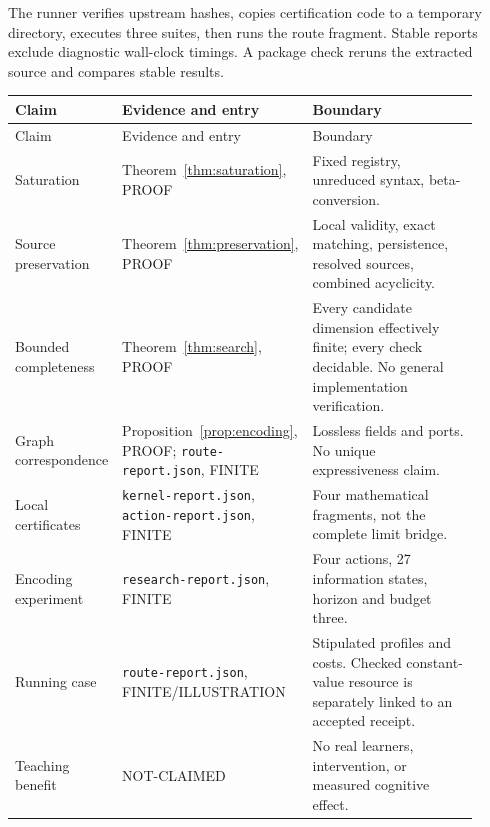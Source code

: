 \documentclass[11pt,a4paper]{article}
\theoremstyle{remark}
\newcommand{\status}[1]{\textsf{\small #1}}
\begin{document}
The runner verifies upstream hashes, copies certification code to a temporary
directory, executes three suites, then runs the route fragment.
Stable reports exclude diagnostic wall-clock timings.
A package check reruns the extracted source and compares stable results.

\begin{longtable}{@{}>{\raggedright\arraybackslash}p{0.23\linewidth}>{\raggedright\arraybackslash}p{0.28\linewidth}>{\raggedright\arraybackslash}p{0.41\linewidth}@{}}
\toprule Claim & Evidence and entry & Boundary\\\midrule\endfirsthead
\toprule Claim & Evidence and entry & Boundary\\\midrule\endhead
Saturation & Theorem~\ref{thm:saturation}, \status{PROOF} &
Fixed registry, unreduced syntax, beta-conversion.\\
Source preservation & Theorem~\ref{thm:preservation}, \status{PROOF} &
Local validity, exact matching, persistence, resolved sources, combined acyclicity.\\
Bounded completeness & Theorem~\ref{thm:search}, \status{PROOF} &
Every candidate dimension effectively finite; every check decidable.
No general implementation verification.\\
Graph correspondence & Proposition~\ref{prop:encoding}, \status{PROOF};
\texttt{route-report.json}, \status{FINITE} &
Lossless fields and ports. No unique expressiveness claim.\\
Local certificates & \texttt{kernel-report.json}, \texttt{action-report.json},
\status{FINITE} & Four mathematical fragments, not the complete limit bridge.\\
Encoding experiment & \texttt{research-report.json}, \status{FINITE} &
Four actions, 27 information states, horizon and budget three.\\
Running case & \texttt{route-report.json},
\status{FINITE}/\status{ILLUSTRATION} &
Stipulated profiles and costs. Checked constant-value resource is separately
linked to an accepted receipt.\\
Teaching benefit & \status{NOT-CLAIMED} &
No real learners, intervention, or measured cognitive effect.\\
\bottomrule
\end{longtable}
\end{document}
